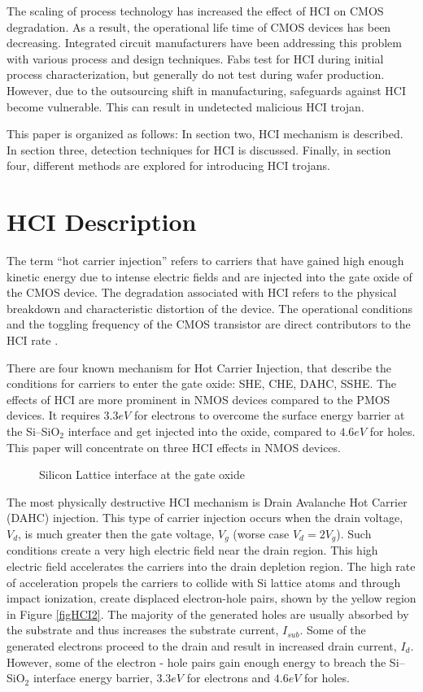 \documentclass[12pt,conference]{IEEEtran}
\begin{document}
The scaling of process technology has increased the effect of HCI on CMOS degradation.
As a result, the operational life time of CMOS devices has been 
decreasing.
Integrated circuit manufacturers have been addressing this problem
with various process and design techniques.
Fabs test for HCI during initial process characterization, but
generally do not test during wafer production.
However, due to the outsourcing shift in
manufacturing, safeguards against HCI become vulnerable.  This can 
result in undetected malicious HCI trojan.  

This paper is organized as follows:
In section two, HCI mechanism is described.
In section three, detection techniques for HCI is discussed.
Finally, in section four, different methods are explored for introducing HCI trojans.


\section*{HCI Description}

The term ``hot carrier injection'' refers to carriers
that have gained high enough kinetic energy due to intense electric
fields and are injected into the gate oxide of the CMOS device.
The degradation associated with HCI refers to the
physical breakdown and characteristic distortion of the device.
The operational conditions and the toggling frequency of
the CMOS transistor are direct contributors to the HCI rate \cite{HCI96A}.

There are four known mechanism for Hot Carrier Injection,
that describe the conditions for carriers to enter the gate oxide: SHE, CHE, DAHC, SSHE. 
The effects of HCI are more prominent in NMOS devices compared
to the PMOS devices.  It requires $3.3eV$ for electrons to
overcome the surface energy barrier at the Si--SiO$_2$ interface
and get injected into the oxide, compared to $4.6eV$ for holes.
This paper will concentrate on three HCI effects in NMOS devices. 
\begin{figure}[htp]
\caption{Silicon Lattice interface at the gate oxide}
\label{figHCI1}
\end{figure}


The most physically destructive HCI mechanism is Drain Avalanche
Hot Carrier (DAHC) injection.
This type of carrier injection occurs when the drain voltage,
$V_d$, is much greater then the gate voltage, $V_g$ (worse case  $V_d=2V_g$).
Such conditions create a very high electric field near the drain region.
This high electric field accelerates the carriers
into the drain depletion region.
The high rate of acceleration propels the carriers to collide
with Si lattice atoms and through impact ionization,
create displaced electron-hole pairs, shown by the yellow
region in Figure \ref{figHCI2}.
The majority of the generated holes are usually absorbed by the
substrate and thus increases the substrate current, $I_{sub}$.
Some of the generated electrons proceed to the drain and result in increased drain
current, $I_d$.  However, some of the electron - hole pairs
gain enough energy to breach the Si--SiO$_2$ interface energy
barrier, $3.3eV$ for electrons and $4.6eV$ for holes.  
\end{document}
